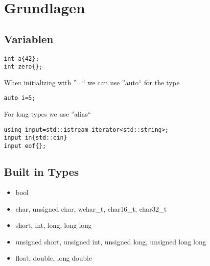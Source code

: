 \section{Grundlagen}

\subsection{Variablen}
\begin{lstlisting}
int a{42};
int zero{};
\end{lstlisting}
When initializing with ''=`` we can use ''auto`` for the type
\begin{lstlisting}
auto i=5;
\end{lstlisting}

For long types we use ''alias``
\begin{lstlisting}
using input=std::istream_iterator<std::string>;
input in{std::cin}
input eof{};
\end{lstlisting}

\subsection{Built in Types}
\begin{itemize}
\item bool
\item char, unsigned char, wchar\_t, char16\_t, char32\_t
\item short, int, long, long long
\item unsigned short, unsigned int, unsigned long, unsigned long long
\item float, double, long double
\end{itemize}